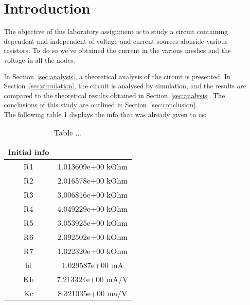 \newpage
\section{Introduction}
\label{sec:introduction}

The objective of this laboratory assignment is to study a circuit containing dependent and independent of voltage and current sources alonside various resistors. To do so we've obtained the current in the various meshes and the voltage in all the nodes.

In Section~\ref{sec:analysis}, a theoretical analysis of the circuit is
presented. In Section~\ref{sec:simulation}, the circuit is analysed by
simulation, and the results are compared to the theoretical results obtained in
Section~\ref{sec:analysis}. The conclusions of this study are outlined in
Section~\ref{sec:conclusion}. \\
\newline
The following table 1 displays the info that was already given to us:

\begin{table}[ht]
\centering
\begin{tabular}{c|c} 
 \hline
Initial info\\ [0.5ex] 
 \hline\hline
R1 & 1.013609e+00 kOhm\\ \hline
R2 & 2.016578e+00 kOhm\\ \hline
R3 & 3.006816e+00 kOhm\\ \hline
R4 & 4.049229e+00 kOhm\\ \hline
R5 & 3.053925e+00 kOhm\\ \hline
R6 & 2.092502e+00 kOhm\\ \hline
R7 & 1.022320e+00 kOhm\\ \hline
Id & 1.029587e+00 mA\\ \hline
Kb & 7.213324e+00 mA/V\\ \hline
Kc & 8.321035e+00 ma/V\\ \hline 
\end{tabular}
\caption{Table ...}
\label{table:1}
\end{table}




